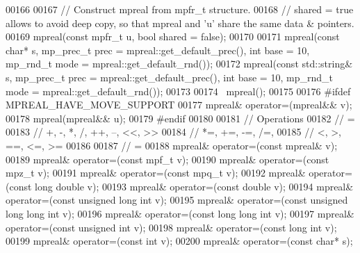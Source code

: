 \begin{DoxyCode}
00166 
00167     \textcolor{comment}{// Construct mpreal from mpfr\_t structure.}
00168     \textcolor{comment}{// shared = true allows to avoid deep copy, so that mpreal and 'u' share the same data & pointers.}
00169     mpreal(\textcolor{keyword}{const} mpfr\_t  u, \textcolor{keywordtype}{bool} shared = \textcolor{keyword}{false});
00170 
00171     mpreal(\textcolor{keyword}{const} \textcolor{keywordtype}{char}* s,             mp\_prec\_t prec = mpreal::get\_default\_prec(), \textcolor{keywordtype}{int} base = 10, mp\_rnd\_t 
      mode = mpreal::get\_default\_rnd());
00172     mpreal(\textcolor{keyword}{const} std::string& s,      mp\_prec\_t prec = mpreal::get\_default\_prec(), \textcolor{keywordtype}{int} base = 10, mp\_rnd\_t 
      mode = mpreal::get\_default\_rnd());
00173 
00174     ~mpreal();
00175 
00176 \textcolor{preprocessor}{#ifdef MPREAL\_HAVE\_MOVE\_SUPPORT}
00177     mpreal& operator=(mpreal&& v);
00178     mpreal(mpreal&& u);
00179 \textcolor{preprocessor}{#endif}
00180 
00181     \textcolor{comment}{// Operations}
00182     \textcolor{comment}{// =}
00183     \textcolor{comment}{// +, -, *, /, ++, --, <<, >>}
00184     \textcolor{comment}{// *=, +=, -=, /=,}
00185     \textcolor{comment}{// <, >, ==, <=, >=}
00186 
00187     \textcolor{comment}{// =}
00188     mpreal& operator=(\textcolor{keyword}{const} mpreal& v);
00189     mpreal& operator=(\textcolor{keyword}{const} mpf\_t v);
00190     mpreal& operator=(\textcolor{keyword}{const} mpz\_t v);
00191     mpreal& operator=(\textcolor{keyword}{const} mpq\_t v);
00192     mpreal& operator=(\textcolor{keyword}{const} \textcolor{keywordtype}{long} \textcolor{keywordtype}{double} v);
00193     mpreal& operator=(\textcolor{keyword}{const} \textcolor{keywordtype}{double} v);
00194     mpreal& operator=(\textcolor{keyword}{const} \textcolor{keywordtype}{unsigned} \textcolor{keywordtype}{long} \textcolor{keywordtype}{int} v);
00195     mpreal& operator=(\textcolor{keyword}{const} \textcolor{keywordtype}{unsigned} \textcolor{keywordtype}{long} \textcolor{keywordtype}{long} \textcolor{keywordtype}{int} v);
00196     mpreal& operator=(\textcolor{keyword}{const} \textcolor{keywordtype}{long} \textcolor{keywordtype}{long} \textcolor{keywordtype}{int} v);
00197     mpreal& operator=(\textcolor{keyword}{const} \textcolor{keywordtype}{unsigned} \textcolor{keywordtype}{int} v);
00198     mpreal& operator=(\textcolor{keyword}{const} \textcolor{keywordtype}{long} \textcolor{keywordtype}{int} v);
00199     mpreal& operator=(\textcolor{keyword}{const} \textcolor{keywordtype}{int} v);
00200     mpreal& operator=(\textcolor{keyword}{const} \textcolor{keywordtype}{char}* s);

\end{DoxyCode}
